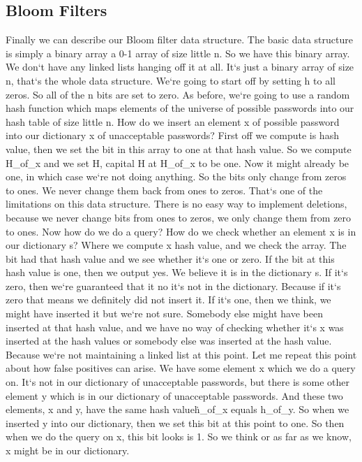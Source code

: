 \subsection{Bloom Filters}
Finally we can describe our Bloom filter data structure.
The basic data structure is simply a binary array a 0-1 array of size little n.
So we have this binary array.
We don`t have any linked lists hanging off it at all.
It`s just a binary array of size n, that`s the whole data structure.
We`re going to start off by setting h to all zeros.
So all of the n bits are set to zero.
As before, we`re going to use a random hash function which maps elements of the universe of possible passwords into our hash table of size little n.
How do we insert an element x of possible password into our dictionary x of unacceptable passwords? First off we compute is hash value, then we set the bit in this array to one at that hash value.
So we compute H\_of\_x and we set H, capital H at H\_of\_x to be one.
Now it might already be one, in which case we`re not doing anything.
So the bits only change from zeros to ones.
We never change them back from ones to zeros.
That`s one of the limitations on this data structure.
There is no easy way to implement deletions, because we never change bits from ones to zeros, we only change them from zero to ones.
Now how do we do a query? How do we check whether an element x is in our dictionary s? Where we compute x hash value, and we check the array.
The bit had that hash value and we see whether it`s one or zero.
If the bit at this hash value is one, then we output yes.
We believe it is in the dictionary s.
If it`s zero, then we`re guaranteed that it no it`s not in the dictionary.
Because if it`s zero that means we definitely did not insert it.
If it`s one, then we think, we might have inserted it but we`re not sure.
Somebody else might have been inserted at that hash value, and we have no way of checking whether it`s x was inserted at the hash values or somebody else was inserted at the hash value.
Because we`re not maintaining a linked list at this point.
Let me repeat this point about how false positives can arise.
We have some element x which we do a query on.
It`s not in our dictionary of unacceptable passwords, but there is some other element y which is in our dictionary of unacceptable passwords.
And these two elements, x and y, have the same hash value\. h\_of\_x equals h\_of\_y.
So when we inserted y into our dictionary, then we set this bit at this point to one.
So then when we do the query on x, this bit looks is 1.
So we think or as far as we know, x might be in our dictionary.
